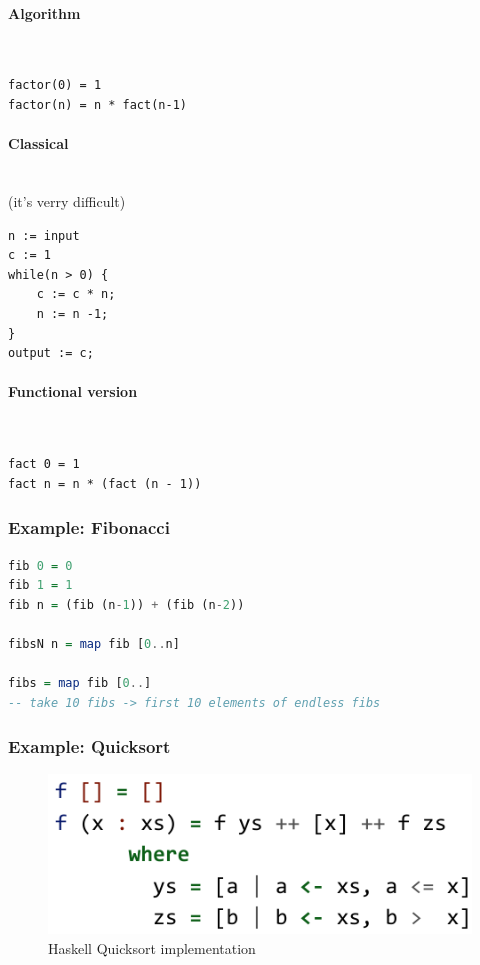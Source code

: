\paragraph{Algorithm} \hfill \\
\begin{lstlisting}
factor(0) = 1
factor(n) = n * fact(n-1)
\end{lstlisting}

\paragraph{Classical} \hfill \\
(it's verry difficult)
\begin{lstlisting}
n := input
c := 1
while(n > 0) {
	c := c * n;
	n := n -1;
}
output := c;
\end{lstlisting}

\paragraph{Functional version} \hfill \\
\begin{lstlisting}
fact 0 = 1
fact n = n * (fact (n - 1))
\end{lstlisting}



\subsubsection{Example: Fibonacci}

\begin{lstlisting}[language=haskell]
fib 0 = 0
fib 1 = 1
fib n = (fib (n-1)) + (fib (n-2))

fibsN n = map fib [0..n]

fibs = map fib [0..]
-- take 10 fibs -> first 10 elements of endless fibs
\end{lstlisting}

\subsubsection{Example: Quicksort}
\begin{figure}
\centering
\includegraphics[width=0.5\linewidth]{images/ha_quicksort}
\caption{Haskell Quicksort implementation}
\label{fig:haquicksort}
\end{figure}


